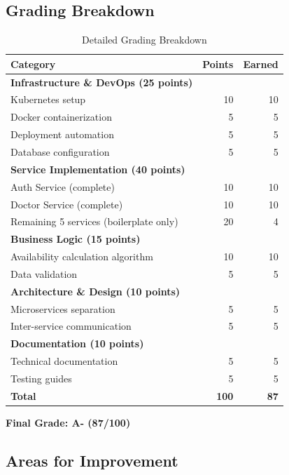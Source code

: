 \documentclass[12pt,a4paper]{article}
\begin{document}
\subsection{Grading Breakdown}

\begin{table}[h]
\centering
\begin{tabular}{@{}p{6cm}rr@{}}
\toprule
\textbf{Category} & \textbf{Points} & \textbf{Earned} \\
\midrule
\textbf{Infrastructure \& DevOps (25 points)} & & \\
\quad Kubernetes setup & 10 & 10 \\
\quad Docker containerization & 5 & 5 \\
\quad Deployment automation & 5 & 5 \\
\quad Database configuration & 5 & 5 \\
\midrule
\textbf{Service Implementation (40 points)} & & \\
\quad Auth Service (complete) & 10 & 10 \\
\quad Doctor Service (complete) & 10 & 10 \\
\quad Remaining 5 services (boilerplate only) & 20 & 4 \\
\midrule
\textbf{Business Logic (15 points)} & & \\
\quad Availability calculation algorithm & 10 & 10 \\
\quad Data validation & 5 & 5 \\
\midrule
\textbf{Architecture \& Design (10 points)} & & \\
\quad Microservices separation & 5 & 5 \\
\quad Inter-service communication & 5 & 5 \\
\midrule
\textbf{Documentation (10 points)} & & \\
\quad Technical documentation & 5 & 5 \\
\quad Testing guides & 5 & 5 \\
\midrule
\textbf{Total} & \textbf{100} & \textbf{87} \\
\bottomrule
\end{tabular}
\caption{Detailed Grading Breakdown}
\end{table}

\textbf{Final Grade: A- (87/100)}

\subsection{Areas for Improvement}
\end{document}
